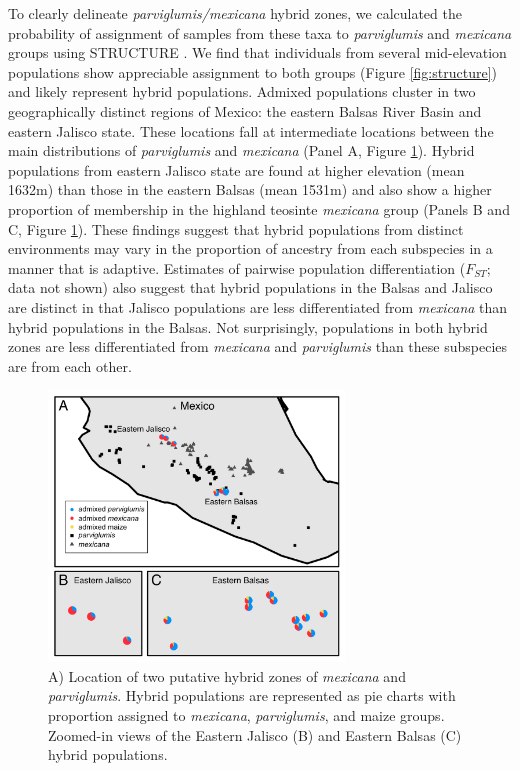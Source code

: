 To clearly delineate \emph{parviglumis/mexicana} hybrid zones, we calculated the probability of assignment of samples from these taxa to \emph{parviglumis} and \emph{mexicana} groups using STRUCTURE \citep{Pritchard2000}.  We find that individuals from several mid-elevation populations show appreciable assignment to both groups (Figure \ref{fig:structure}) and likely represent hybrid populations.  
Admixed populations cluster in two geographically distinct regions of Mexico: the eastern Balsas River Basin and eastern Jalisco state.
These locations fall at intermediate locations between the main distributions of \emph{parviglumis} and \emph{mexicana} (Panel A, Figure \ref{fig:pies}).
Hybrid populations from eastern Jalisco state are found at higher elevation (mean 1632m) than those in the eastern Balsas (mean 1531m) and also show a higher proportion of membership in the highland teosinte \emph{mexicana} group (Panels B and C, Figure \ref{fig:pies}).
These findings suggest that hybrid populations from distinct environments may vary in the proportion of ancestry from each subspecies in a manner that is adaptive.
Estimates of pairwise population differentiation ($F_{ST}$; data not shown) also suggest that hybrid populations in the Balsas and Jalisco are distinct in that Jalisco populations are less differentiated from \emph{mexicana} than hybrid populations in the Balsas.  Not surprisingly, populations in both hybrid zones are less differentiated from \emph{mexicana} and \emph{parviglumis} than these subspecies are from each other.

\begin{figure}[h!]
  \centering
   \includegraphics[width=0.7\textwidth]{Figure1.jpg}
    \caption{A) Location of two putative hybrid zones of \emph{mexicana} and \emph{parviglumis}.  Hybrid populations are represented as pie charts with proportion assigned to \emph{mexicana}, \emph{parviglumis}, and maize groups. Zoomed-in views of the Eastern Jalisco (B) and Eastern Balsas (C) hybrid populations.} 
\label{fig:pies}
\end{figure}


